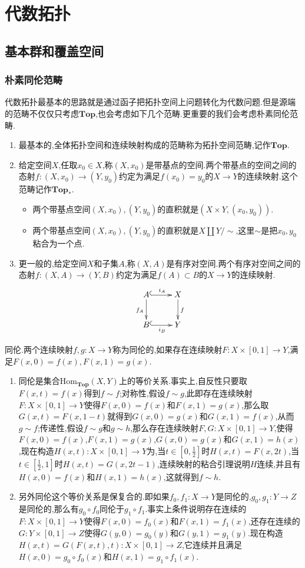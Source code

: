 \chapter{代数拓扑}
\section{基本群和覆盖空间}
\subsection{朴素同伦范畴}

代数拓扑最基本的思路就是通过函子把拓扑空间上问题转化为代数问题.但是源端的范畴不仅仅只考虑$\textbf{Top}$,也会考虑如下几个范畴.更重要的我们会考虑朴素同伦范畴.
\begin{enumerate}
	\item 最基本的,全体拓扑空间和连续映射构成的范畴称为拓扑空间范畴,记作$\textbf{Top}$.
	\item 给定空间$X$,任取$x_0\in X$,称$(X,x_0)$是带基点的空间.两个带基点的空间之间的态射$f:(X,x_0)\to (Y,y_0)$约定为满足$f(x_0)=y_0$的$X\to Y$的连续映射.这个范畴记作$\textbf{Top}_*$.
	\begin{itemize}
		\item 两个带基点空间$(X,x_0),(Y,y_0)$的直积就是$(X\times Y,(x_0,y_0))$.
		\item 两个带基点空间$(X,x_0),(Y,y_0)$的直积就是$X\coprod Y/\sim$,这里$\sim$是把$x_0,y_0$粘合为一个点.
	\end{itemize}
	\item 更一般的,给定空间$X$和子集$A$,称$(X,A)$是有序对空间.两个有序对空间之间的态射$f:(X,A)\to(Y,B)$约定为满足$f(A)\subset B$的$X\to Y$的连续映射.
	$$\xymatrix{A\ar@{^{(}->}[r]^{i_A}\ar[d]_{f_A}&X\ar[d]^{f}\\B\ar@{^{(}->}[r]_{i_B}&Y}$$
\end{enumerate}

同伦.两个连续映射$f,g:X\to Y$称为同伦的,如果存在连续映射$F:X\times [0,1]\to Y$,满足$F(x,0)=f(x),F(x,1)=g(x)$.
\begin{enumerate}
	\item 同伦是集合$\mathrm{Hom}_{\textbf{Top}}(X,Y)$上的等价关系.事实上,自反性只要取$F(x,t)=f(x)$得到$f\sim f$;对称性,假设$f\sim g$,此即存在连续映射$F:X\times[0,1]\to Y$使得$F(x,0)=f(x)$和$F(x,1)=g(x)$,那么取$G(x,t)=F(x,1-t)$就得到$G(x,0)=g(x)$和$G(x,1)=f(x)$,从而$g\sim f$;传递性,假设$f\sim g$和$g\sim h$,那么存在连续映射$F,G:X\times[0,1]\to Y$,使得$F(x,0)=f(x)$,$F(x,1)=g(x)$,$G(x,0)=g(x)$和$G(x,1)=h(x)$,现在构造$H(x,t):X\times[0,1]\to Y$为,当$t\in[0,\frac{1}{2}]$时$H(x,t)=F(x,2t)$,当$t\in[\frac{1}{2},1]$时$H(x,t)=G(x,2t-1)$,连续映射的粘合引理说明$H$连续,并且有$H(x,0)=f(x)$和$H(x,1)=h(x)$,这就得到$f\sim h$.
	\item 另外同伦这个等价关系是保复合的.即如果$f_0,f_1:X\to Y$是同伦的,$g_0,g_1:Y\to Z$是同伦的,那么有$g_0\circ f_0$同伦于$g_1\circ f_1$.事实上条件说明存在连续的$F:X\times[0,1]\to Y$使得$F(x,0)=f_0(x)$和$F(x,1)=f_1(x)$,还存在连续的$G:Y\times[0,1]\to Z$使得$G(y,0)=g_0(y)$和$G(y,1)=g_1(y)$.现在构造$H(x,t)=G(F(x,t),t):X\times[0,1]\to Z$,它连续并且满足$H(x,0)=g_0\circ f_0(x)$和$H(x,1)=g_1\circ f_1(x)$.
\end{enumerate}

